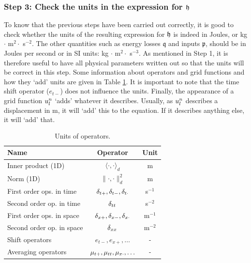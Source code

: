 {{\subsubsection{Step 3: Check the units in the expression for $\mathfrak{h}$}
To know that the previous steps have been carried out correctly, it is good to check whether the units of the resulting expression for $\mathfrak{h}$ is indeed in Joules, or kg $\cdot$ m$^2 \cdot $ s$^{-2}$. The other quantities such as energy losses $\mathfrak{q}$ and inputs $\mathfrak{p}$, should be in Joules per second or in SI units: kg $\cdot$ m$^2 \cdot $ s$^{-3}$. As mentioned in Step 1, it is therefore useful to have all physical parameters written out so that the units will be correct in this step. Some information about operators and grid functions and how they `add' units are given in Table \ref{tab:units}. It is important to note that the time shift operator ($e_{t-}$) does not influence the units. Finally, the appearance of a grid function $u_l^n$ `adds' whatever it describes. Usually, as $u_l^n$ describes a displacement in m, it will `add' this to the equation. If it describes anything else, it will `add' that.

{\renewcommand{\arraystretch}{1.2}

\begin{table}[h]
    \begin{center}
    \begin{tabular}{|l|c|c|}
        \hline
        Name & Operator & Unit\\ \hline
        Inner product (1D) & $\langle \cdot, \cdot\rangle_d$ & m\\
        Norm (1D) & $\lVert \cdot, \cdot\rVert_d^2$ & m\\
        First order ops. in time & $\delta_{t+}, \delta_{t-}, \delta_{t\cdot}$ & s$^{-1}$\\
        Second order op. in time & $\delta_{tt}$ & s$^{-2}$\\
        First order ops. in space & $\delta_{x+}, \delta_{x-}, \delta_{x\cdot}$ & m$^{-1}$\\
        Second order op. in space & $\delta_{xx}$ & m$^{-2}$\\
        Shift operators & $e_{t-}, e_{x+}, \hdots$ & -\\
        Averaging operators & $\mu_{t+}, \mu_{tt}, \mu_{x\cdot}, \hdots$ & -\\\hline
    \end{tabular}
    \caption{Units of operators.\label{tab:units}}
    \end{center}
\end{table}
{\renewcommand{\arraystretch}{1}

}}}}

